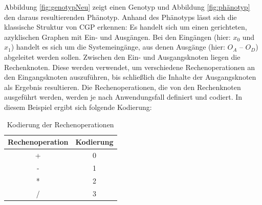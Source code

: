 Abbildung \ref{fig:genotypNeu} zeigt einen Genotyp und Abbildung \ref{fig:phänotyp} den daraus resultierenden Phänotyp.
Anhand des Phänotyps lässt sich die klassische Struktur von CGP erkennen:
Es handelt sich um einen gerichteten, azyklischen Graphen mit Ein- und Ausgängen.
Bei den Eingängen (hier: $x_0$ und $x_1$) handelt es sich um die Systemeingänge, aus denen Ausgänge (hier: $O_A$ – $O_D$) abgeleitet werden sollen.
Zwischen den Ein- und Ausgangsknoten liegen die Rechenknoten.
Diese werden verwendet, um verschiedene Rechenoperationen an den Eingangsknoten auszuführen, bis schließlich die Inhalte der Ausgangsknoten als Ergebnis resultieren.
Die Rechenoperationen, die von den Rechenknoten ausgeführt werden, werden je nach Anwendungsfall definiert und codiert.
In diesem Beispiel ergibt sich folgende Kodierung:

\begin{table}[h]
    \centering
    \begin{tabular}{c | c}
       \textbf{Rechenoperation} & \textbf{Kodierung} \\ \hline
        + & 0 \\ \hline
        - & 1 \\ \hline
        * & 2 \\ \hline
        / & 3
    \end{tabular}
    \caption{Kodierung der Rechenoperationen}
    \label{table:kodierung}
\end{table}

